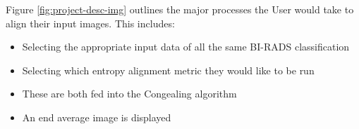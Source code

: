 Figure \ref{fig:project-desc-img} outlines the major processes the User would take to align their input images. This includes:

\begin{itemize}
  \item Selecting the appropriate input data of all the same BI-RADS classification
  \item Selecting which entropy alignment metric they would like to be run
  \item These are both fed into the \Gls{Congealing} algorithm
  \item An end average image is displayed
\end{itemize}
